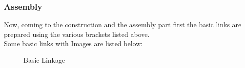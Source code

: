 \documentclass[12pt]{article}
\begin{document}
\subsubsection{Assembly}
Now, coming to the construction and the assembly part first the basic links are prepared
using the various brackets listed above.\\
Some basic links with Images are listed below:\\
\begin{figure}[h!]
	\centering
	\hspace{2cm}
	\newline
	
	\caption{Basic Linkage}
\end{figure}
\newpage
\end{document}
